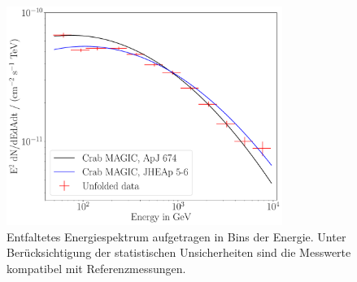 \begin{figure}
  \centering
  \includegraphics[width=0.8\textwidth]{figures/combunfold_energyspectrum.pdf}
  \caption{Entfaltetes Energiespektrum aufgetragen in Bins der Energie. Unter
  Berücksichtigung der statistischen Unsicherheiten sind die Messwerte
  kompatibel mit Referenzmessungen.}
  \label{fig:entfaltung}
\end{figure}
